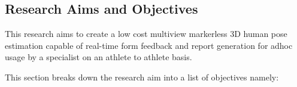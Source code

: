 

\subsection{Research Aims and Objectives}
\label{sec:researchaimsandobjectives}

This research aims to create a low cost multiview markerless 3D human pose estimation capable of real-time form feedback and report generation for adhoc usage by a specialist on an athlete to athlete basis.

This section breaks down the research aim into a list of objectives namely:

